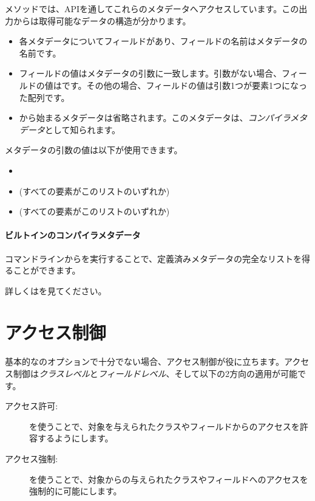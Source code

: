 メソッドでは、APIを通してこれらのメタデータへアクセスしています。この出力からは取得可能なデータの構造が分かります。

\begin{itemize}
	\item 各メタデータについてフィールドがあり、フィールドの名前はメタデータの名前です。
	\item フィールドの値はメタデータの引数に一致します。引数がない場合、フィールドの値はです。その他の場合、フィールドの値は引数1つが要素1つになった配列です。
	\item \expr{:}から始まるメタデータは省略されます。このメタデータは、\emph{コンパイラメタデータ}として知られます。
\end{itemize}

メタデータの引数の値は以下が使用できます。

\begin{itemize}
	\item {}
	\item {} (すべての要素がこのリストのいずれか)
	\item {} (すべての要素がこのリストのいずれか)
\end{itemize}

\paragraph{ビルトインのコンパイラメタデータ}
コマンドラインからを実行することで、定義済みメタデータの完全なリストを得ることができます。

詳しくはを見てください。

\section{アクセス制御}
\label{lf-access-control}

基本的なのオプションで十分でない場合、アクセス制御が役に立ちます。アクセス制御は\emph{クラスレベル}と\emph{フィールドレベル}、そして以下の2方向の適用が可能です。

\begin{description}
	\item[アクセス許可:] を使うことで、対象を与えられたクラスやフィールドからのアクセスを許容するようにします。
	\item[アクセス強制:] を使うことで、対象からの与えられたクラスやフィールドへのアクセスを強制的に可能にします。
\end{description}


